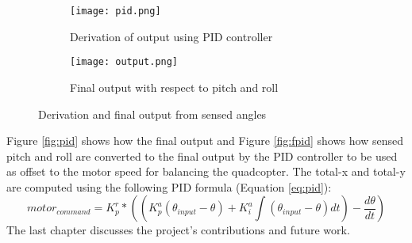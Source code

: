 \begin{figure}[H]
  \begin{subfigure}{1\textwidth}
    \centering
    \texttt{[image: pid.png]}
    \caption{Derivation of output using PID controller\label{fig:pid}}
    \label{Motor output}  
  \end{subfigure}
  \begin{subfigure}{1\textwidth}
    \centering
    \texttt{[image: output.png]}
    \caption{Final output with respect to pitch and roll\label{fig:fpid}}
    \label{Measurement of pitch and roll} 
  \end{subfigure}
  \caption{Derivation and final output from sensed angles}
\end{figure}
\noindent
Figure \ref{fig:pid} shows how the final output and Figure \ref{fig:fpid} shows how sensed pitch and roll are converted to the final output by the PID controller to be used as offset to the motor speed for balancing the quadcopter. The total-x and total-y are computed using the following PID formula (Equation \ref{eq:pid}):
\begin{equation}
motor_{command} = K_p^r*((K_p^a(\theta_{input} - \theta) + K_i^a\int (\theta_{input} - \theta)dt) -\frac{d\theta}{dt})
\label{eq:pid} 
\end{equation}
\newline
The last chapter discusses the project's contributions and future work.
